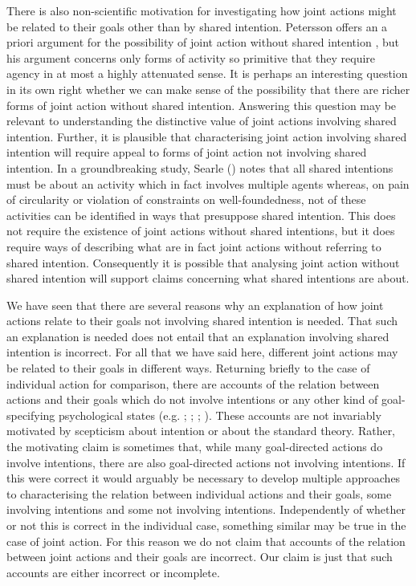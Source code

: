 \documentclass[12pt,a4paper]{extarticle}
\begin{document}
There is also non-scientific motivation for investigating how joint actions might be related to their goals other than by shared intention.  
Petersson offers an a priori argument for the possibility of joint action without shared intention \citep{petersson_collectivity_2007}, but his argument concerns only forms of activity so primitive that they require agency in at most a highly attenuated sense.
It is perhaps an interesting question in its own right whether we can make sense of the possibility that there are richer forms of joint action without shared intention.
Answering this question may be relevant to understanding the distinctive value of joint actions involving shared intention.
Further, it is plausible that characterising joint action involving shared intention will require appeal to forms of joint action not involving shared intention.
In a groundbreaking study, Searle (\citeyear{Searle:1990em}) notes that all shared intentions must be about an activity which in fact involves multiple agents whereas, on pain of circularity or violation of constraints on well-foundedness, not of these activities can be  identified in ways that presuppose shared intention.
This does not require the existence of joint actions without shared intentions, but it does require ways of describing what are in fact joint actions without referring to shared intention.
Consequently it is possible that analysing joint action without shared intention will support claims concerning what shared intentions are about.

We have seen that there are several reasons why an explanation of how joint actions relate to their goals not involving shared intention is needed.  
That such an explanation is needed does not entail that an explanation involving shared intention is incorrect.  For all that we have said here, different joint actions may be related to their goals in different ways.  
Returning briefly to the case of individual action for comparison, there are accounts of the relation between actions and their goals which do not involve intentions or any other kind of goal-specifying psychological states
(e.g.
	\citealp{Bennett:1976rg};
	\citealp{Butterfill:2001kc};
	\citealp{Schueler:2003fk};
	\citealp{Taylor:1964tr}).
These accounts are not invariably motivated by scepticism about intention or about the standard theory.  Rather, the motivating claim is sometimes that, while many goal-directed actions do involve intentions, there are also goal-directed actions not involving intentions.  If this were correct it would arguably be necessary to develop multiple approaches to characterising the relation between individual actions and their goals, some involving intentions and some not involving intentions.  Independently of whether or not this is correct in the individual case, something similar may be true in the case of joint action.  For this reason we do not claim that accounts of the relation between joint actions and their goals are incorrect.  Our claim is just that such accounts are either incorrect or incomplete.
\end{document}

